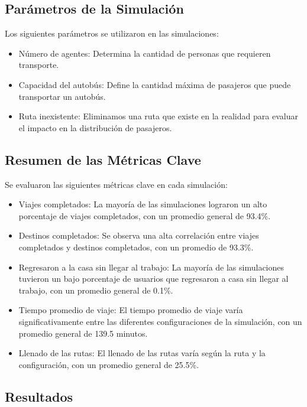 \documentclass[a4paper,12pt]{article}
\begin{document}
\subsection{Parámetros de la Simulación}

Los siguientes parámetros se utilizaron en las simulaciones:

\begin{itemize}
\item Número de agentes: Determina la cantidad de personas que requieren transporte.
\item Capacidad del autobús: Define la cantidad máxima de pasajeros que puede transportar un autobús.
\item Ruta inexistente: Eliminamos una ruta que existe en la realidad para evaluar el impacto en la distribución de pasajeros.
\end{itemize}

\subsection{Resumen de las Métricas Clave}

Se evaluaron las siguientes métricas clave en cada simulación:

\begin{itemize}
\item Viajes completados: La mayoría de las simulaciones lograron un alto porcentaje de viajes completados, con un promedio general de 93.4\%.
\item Destinos completados: Se observa una alta correlación entre viajes completados y destinos completados, con un promedio de 93.3\%.
\item Regresaron a la casa sin llegar al trabajo: La mayoría de las simulaciones tuvieron un bajo porcentaje de usuarios que regresaron a casa sin llegar al trabajo, con un promedio general de 0.1\%.
\item Tiempo promedio de viaje: El tiempo promedio de viaje varía significativamente entre las diferentes configuraciones de la simulación, con un promedio general de 139.5 minutos.
\item Llenado de las rutas: El llenado de las rutas varía según la ruta y la configuración, con un promedio general de 25.5\%.
\end{itemize}

\subsection{Resultados}
\end{document}
